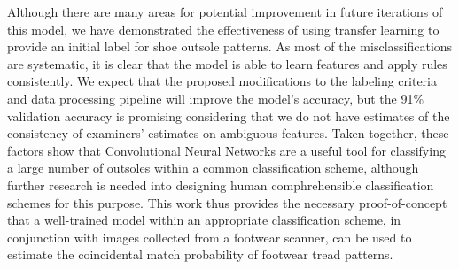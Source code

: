 \documentclass{article}\usepackage[]{graphicx}\usepackage[table]{xcolor}
\begin{document}
Although there are many areas for potential improvement in future iterations of this model, we have demonstrated the effectiveness of using transfer learning to provide an initial label for shoe outsole patterns. As most of the misclassifications are systematic, it is clear that the model is able to learn features and apply rules consistently. We expect that the proposed modifications to the labeling criteria and data processing pipeline will improve the model's accuracy, but the 91\% validation accuracy is promising considering that we do not have estimates of the consistency of examiners' estimates on ambiguous features. Taken together, these factors show that Convolutional Neural Networks are a useful tool for classifying a large number of outsoles within a common classification scheme, although further research is needed into designing human comphrehensible classification schemes for this purpose. This work thus provides the necessary proof-of-concept that a well-trained model within an appropriate classification scheme, in conjunction with images collected from a footwear scanner, can be used to estimate the coincidental match probability of footwear tread patterns.






\end{document}
